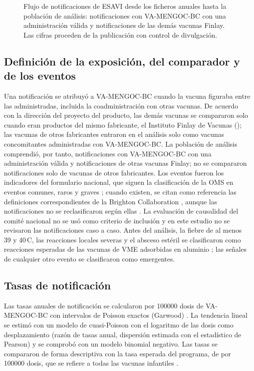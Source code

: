 \documentclass[11pt]{article}
\begin{document}
\begin{figure}[tbp]
\centering
\ReportFlow
\caption{Flujo de notificaciones de ESAVI desde los ficheros anuales hasta la población de
análisis: notificaciones con VA-MENGOC-BC con una administración válida y notificaciones de las
demás vacunas Finlay. Las cifras proceden de la publicación con control de divulgación.}
\label{fig:flow}
\end{figure}

\subsection{Definición de la exposición, del comparador y de los eventos}\label{sec:events}
Una notificación se atribuyó a VA-MENGOC-BC cuando la vacuna figuraba entre las administradas,
incluida la coadministración con otras vacunas. De acuerdo con la dirección del proyecto del
producto, las demás vacunas se compararon solo cuando eran productos del mismo fabricante, el
Instituto Finlay de Vacunas (\POComparatorList); las vacunas de otros fabricantes entraron en el
análisis solo como vacunas concomitantes administradas con VA-MENGOC-BC. La población de análisis
comprendió, por tanto, \PONTargetAnalysed{} notificaciones con VA-MENGOC-BC con una administración
válida y \PONFinlayComparator{} notificaciones de otras vacunas Finlay; no se compararon
\PONNonFinlayOnly{} notificaciones solo de vacunas de otros fabricantes. Los eventos fueron los \PONEventsScreened{}
indicadores del formulario nacional, que siguen la clasificación de la OMS en eventos comunes, raros
y graves \cite{WHO2016AEFI,CIOMS2012}; cuando existen, se citan como referencia las definiciones
correspondientes de la Brighton Collaboration
\cite{Marcy2004,Bonhoeffer2004Crying,Bonhoeffer2004Seizure,Ruggeberg2007,Kohl2007,Buettcher2007,Wise2007,Gidudu2008,Sejvar2007,Tapiainen2007},
aunque las notificaciones no se reclasificaron según ellas \cite{Kohl2008}. La evaluación de
causalidad del comité nacional \cite{WHO2018Causality} no se usó como criterio de inclusión y en este
estudio no se revisaron las notificaciones caso a caso. Antes del análisis, la fiebre de al menos 39
y 40\,\textdegree{}C, las reacciones locales severas y el absceso estéril se clasificaron como
reacciones esperadas de las vacunas de VME adsorbidas en aluminio
\cite{Nokleby2007,Holst2009,Jefferson2004}; las señales de cualquier otro evento se clasificaron como
emergentes.

\subsection{Tasas de notificación}\label{sec:m-rates}
Las tasas anuales de notificación se calcularon por \num{100000} dosis de VA-MENGOC-BC con
intervalos de Poisson exactos (Garwood) \cite{Garwood1936}. La tendencia lineal se estimó con un
modelo de cuasi-Poisson con el logaritmo de las dosis como desplazamiento (razón de tasas anual,
dispersión estimada con el estadístico de Pearson) y se comprobó con un modelo binomial negativo.
Las tasas se compararon de forma descriptiva con la tasa esperada del programa, de
\POExpectedRate{} por \num{100000} dosis, que se refiere a todas las vacunas infantiles
\cite{CruzRodriguez2021,Mahaux2016}.
\end{document}
